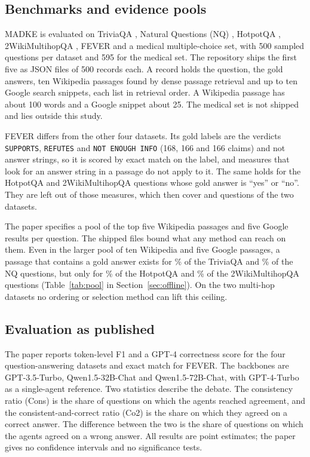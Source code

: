 \subsection{Benchmarks and evidence pools}
MADKE is evaluated on TriviaQA \cite{joshi2017triviaqa}, Natural Questions (NQ) \cite{kwiatkowski2019nq}, HotpotQA \cite{yang2018hotpotqa}, 2WikiMultihopQA \cite{ho2020twowiki}, FEVER \cite{thorne2018fever} and a medical multiple-choice set, with 500 sampled questions per dataset and 595 for the medical set. The repository ships the first five as JSON files of 500 records each. A record holds the question, the gold answers, ten Wikipedia passages found by dense passage retrieval \cite{karpukhin2020dpr} and up to ten Google search snippets, each list in retrieval order. A Wikipedia passage has about 100 words and a Google snippet about 25. The medical set is not shipped and lies outside this study.

FEVER differs from the other four datasets. Its gold labels are the verdicts \texttt{SUPPORTS}, \texttt{REFUTES} and \texttt{NOT ENOUGH INFO} (168, 166 and 166 claims) and not answer strings, so it is scored by exact match on the label, and measures that look for an answer string in a passage do not apply to it. The same holds for the \VNVerdictGoldHQA{} HotpotQA and \VNVerdictGoldWMQ{} 2WikiMultihopQA questions whose gold answer is ``yes'' or ``no''. They are left out of those measures, which then cover \VNSpanHQA{} and \VNSpanWMQ{} questions of the two datasets.

The paper specifies a pool of the top five Wikipedia passages and five Google results per question. The shipped files bound what any method can reach on them. Even in the larger pool of ten Wikipedia and five Google passages, a passage that contains a gold answer exists for \VCoverRelTQA\% of the TriviaQA and \VCoverRelNQ\% of the NQ questions, but only for \VCoverRelHQA\% of the HotpotQA and \VCoverRelWMQ\% of the 2WikiMultihopQA questions (Table~\ref{tab:pool} in Section~\ref{sec:offline}). On the two multi-hop datasets no ordering or selection method can lift this ceiling.

\subsection{Evaluation as published}
The paper reports token-level F1 and a GPT-4 correctness score for the four question-answering datasets and exact match for FEVER. The backbones are GPT-3.5-Turbo, Qwen1.5-32B-Chat and Qwen1.5-72B-Chat, with GPT-4-Turbo as a single-agent reference. Two statistics describe the debate. The consistency ratio (Cons) is the share of questions on which the agents reached agreement, and the consistent-and-correct ratio (Co2) is the share on which they agreed on a correct answer. The difference between the two is the share of questions on which the agents agreed on a wrong answer. All results are point estimates; the paper gives no confidence intervals and no significance tests.


